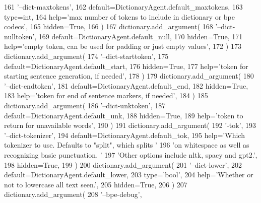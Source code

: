 \begin{DoxyCode}
161             \textcolor{stringliteral}{'--dict-maxtokens'},
162             default=DictionaryAgent.default\_maxtokens,
163             type=int,
164             help=\textcolor{stringliteral}{'max number of tokens to include in dictionary or bpe codecs'},
165             hidden=\textcolor{keyword}{True},
166         )
167         dictionary.add\_argument(
168             \textcolor{stringliteral}{'--dict-nulltoken'},
169             default=DictionaryAgent.default\_null,
170             hidden=\textcolor{keyword}{True},
171             help=\textcolor{stringliteral}{'empty token, can be used for padding or just empty values'},
172         )
173         dictionary.add\_argument(
174             \textcolor{stringliteral}{'--dict-starttoken'},
175             default=DictionaryAgent.default\_start,
176             hidden=\textcolor{keyword}{True},
177             help=\textcolor{stringliteral}{'token for starting sentence generation, if needed'},
178         )
179         dictionary.add\_argument(
180             \textcolor{stringliteral}{'--dict-endtoken'},
181             default=DictionaryAgent.default\_end,
182             hidden=\textcolor{keyword}{True},
183             help=\textcolor{stringliteral}{'token for end of sentence markers, if needed'},
184         )
185         dictionary.add\_argument(
186             \textcolor{stringliteral}{'--dict-unktoken'},
187             default=DictionaryAgent.default\_unk,
188             hidden=\textcolor{keyword}{True},
189             help=\textcolor{stringliteral}{'token to return for unavailable words'},
190         )
191         dictionary.add\_argument(
192             \textcolor{stringliteral}{'-tok'},
193             \textcolor{stringliteral}{'--dict-tokenizer'},
194             default=DictionaryAgent.default\_tok,
195             help=\textcolor{stringliteral}{'Which tokenizer to use. Defaults to "split", which splits '}
196             \textcolor{stringliteral}{'on whitespace as well as recognizing basic punctuation. '}
197             \textcolor{stringliteral}{'Other options include nltk, spacy and gpt2.'},
198             hidden=\textcolor{keyword}{True},
199         )
200         dictionary.add\_argument(
201             \textcolor{stringliteral}{'--dict-lower'},
202             default=DictionaryAgent.default\_lower,
203             type=\textcolor{stringliteral}{'bool'},
204             help=\textcolor{stringliteral}{'Whether or not to lowercase all text seen.'},
205             hidden=\textcolor{keyword}{True},
206         )
207         dictionary.add\_argument(
208             \textcolor{stringliteral}{'--bpe-debug'},

\end{DoxyCode}
